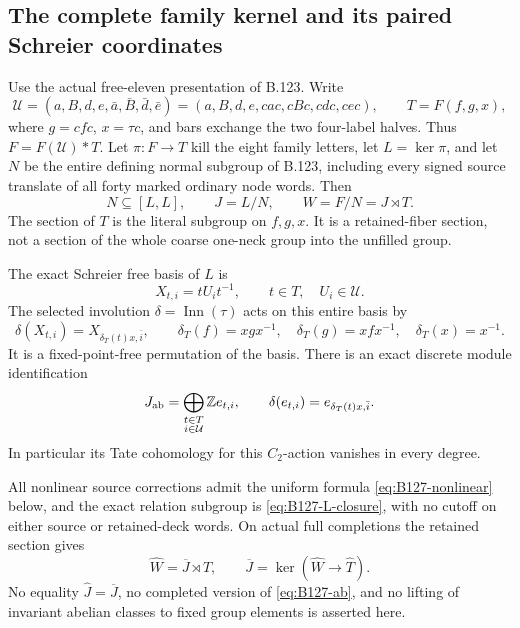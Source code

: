 \subsection*{The complete family kernel and its paired Schreier coordinates}

\label{stmt:B127}
Use the actual free-eleven presentation of B.123. Write
\[
 \mathcal U=(a,B,d,e,\bar a,\bar B,\bar d,\bar e)
 =(a,B,d,e,cac,cBc,cdc,cec),\qquad T=F(f,g,x),
\]
where \(g=cfc\), \(x=\tau c\), and bars exchange the two four-label
halves. Thus \(F=F(\mathcal U)*T\). Let \(\pi:F\to T\) kill the
eight family letters, let \(L=\ker\pi\), and let \(N\) be the
entire defining normal subgroup of B.123, including every signed
source translate of all forty marked ordinary node words.
Then
\begin{equation}\label{eq:B127-section}
 N\subseteq[L,L],\qquad J=L/N,\qquad W=F/N=J\rtimes T.
\end{equation}
The section of \(T\) is the literal subgroup on \(f,g,x\).
It is a retained-fiber section, not a section of the whole
coarse one-neck group into the unfilled group.

The exact Schreier free basis of \(L\) is
\begin{equation}\label{eq:B127-basis}
 X_{t,i}=tU_i t^{-1},\qquad t\in T,\quad U_i\in\mathcal U.
\end{equation}
The selected involution \(\delta=\operatorname{Inn}(\tau)\) acts
on this entire basis by
\begin{equation}\label{eq:B127-pairing}
 \delta(X_{t,i})=X_{\delta_T(t)x,\bar i},\qquad
 \delta_T(f)=xgx^{-1},\quad
 \delta_T(g)=xfx^{-1},\quad \delta_T(x)=x^{-1}.
\end{equation}
It is a fixed-point-free permutation of the basis.
There is an exact discrete module identification
\begin{equation}\label{eq:B127-ab}
 J_{\rm ab}
   =\bigoplus_{\substack{t\in T\\i\in\mathcal U}}\mathbb Z e_{t,i},
 \qquad
 \delta(e_{t,i})=e_{\delta_T(t)x,\bar i}.
\end{equation}
In particular its Tate cohomology for this \(C_2\)-action
vanishes in every degree.

All nonlinear source corrections admit the uniform formula
\eqref{eq:B127-nonlinear} below, and the exact relation subgroup
is \eqref{eq:B127-L-closure}, with no cutoff on either source
or retained-deck words. On actual full completions the retained
section gives
\[
 \widehat W=\overline J\rtimes\widehat T,\qquad
 \overline J=\ker(\widehat W\to\widehat T).
\]
No equality \(\widehat J=\overline J\), no completed version of
\eqref{eq:B127-ab}, and no lifting of invariant abelian classes
to fixed group elements is asserted here.

